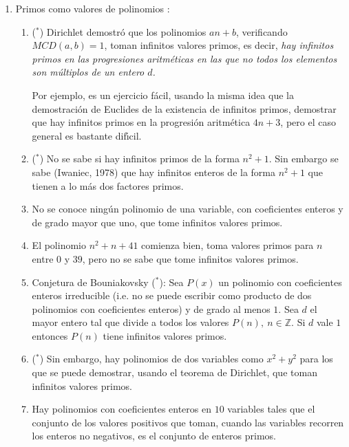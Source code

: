 \begin{enumerate}
\begin{enumerate}
 \item ($^*$) Se sabe que todos los pares de primos gemelos $(p,p+2),\ p\ge 5$
son de
la forma $(6n-1,6n+1)$ para alg\'un $n$. Esto se debe a que todo primo mayor o
igual a cinco es de la forma $6n-1$ o de la forma $6n+1.$
 
\item ($^*$) {\sc Ejercicio}: encontrar todos los enteros $p$ tales que
$p,p+4,p+6,p+10,p+12,p+16,p+22$ sean todos primos.
 
 
 
 
 \end{enumerate}
 
 \item{\sc Primos como valores de polinomios }:
 \begin{enumerate}
 \item ($^*$) Dirichlet demostr\'o que los polinomios  $an+b$, verificando
$MCD(a,b)=1$, toman infinitos valores primos, es decir, {\itshape
 hay infinitos primos en las  progresiones aritm\'eticas en las que no todos los
elementos son m\'ultiplos de un entero $d$.}
 
 Por ejemplo,  es un ejercicio f\'acil,  usando la misma idea que la
demostraci\'on de Euclides
de la existencia de infinitos primos, demostrar que hay infinitos primos en la
progresi\'on aritm\'etica $4n+3$, pero el caso general es bastante dif\'{\i}cil.
 
 \item ($^*$) No se sabe si hay infinitos primos de la forma $n^2+1$. Sin
embargo se
sabe (Iwaniec, 1978)
que hay infinitos enteros de la forma  $n^2+1$ que tienen a lo m\'as dos
factores primos.
 \item No se conoce ning\'un polinomio de una variable, con coeficientes enteros
 y de grado mayor que uno, que tome infinitos valores primos.
 \item El polinomio $n^2+n+41$ comienza bien, toma valores primos para $n$ entre
$0$ y $39$, pero no se sabe que tome infinitos valores primos.
 
 \item {\sc Conjetura de Bouniakovsky ($^*$)}: Sea $P(x)$ un polinomio con
coeficientes
enteros  irreducible (i.e. no se puede escribir como producto de dos polinomios
con coeficientes enteros) y  de grado al menos $1$. Sea  $d$ el mayor entero tal
que divide a todos los valores  $P(n),\ n\in \mathbb{Z}$. Si $d$ vale $1$
entonces $P(n)$ tiene infinitos valores primos.  
 
 
 \item ($^*$) Sin embargo, hay polinomios de dos variables como $x^2+y^2$ para
los que
se puede demostrar, usando el teorema de Dirichlet, que toman infinitos valores
primos. 

\item Hay polinomios con coeficientes enteros en $10$ variables tales que el
conjunto de  los valores positivos que toman, cuando las variables recorren los
enteros no negativos, es el conjunto de enteros primos.
\end{enumerate}
\end{enumerate}

